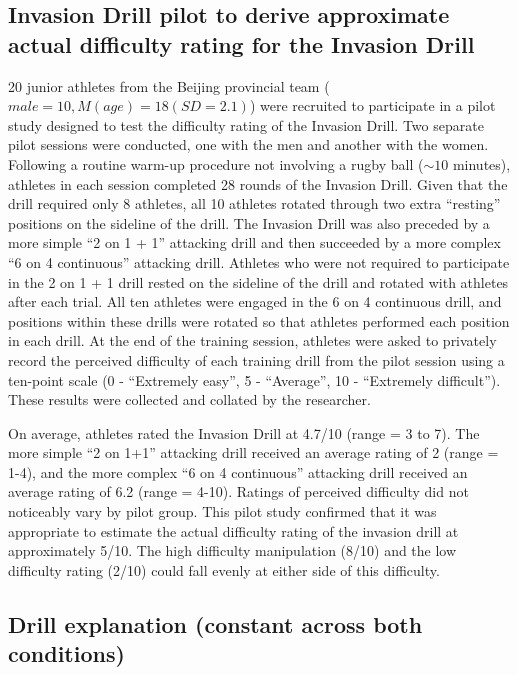 \subsection{Invasion Drill pilot to derive approximate actual difficulty rating for the Invasion Drill\label{app9:difficultyPilot}}
20 junior athletes from the Beijing provincial team ($male = 10,  M(age) = 18 (SD = 2.1)$) were recruited to participate in a pilot study designed to test the difficulty rating of the Invasion Drill.  Two separate pilot sessions were conducted, one with the men and another with the women.  Following a routine warm-up procedure not involving a rugby ball ($\sim10$ minutes), athletes in each session completed 28 rounds of the Invasion Drill.  Given that the drill required only 8 athletes, all 10 athletes rotated through two extra ``resting'' positions on the sideline of the drill.  The Invasion Drill was also preceded by a more simple ``2 on 1 + 1'' attacking drill and then succeeded by a more complex ``6 on 4 continuous'' attacking drill.  Athletes who were not required to participate in the 2 on 1 + 1 drill rested on the sideline of the drill and rotated with athletes after each trial.  All ten athletes were engaged in the 6 on 4 continuous drill, and positions within these drills were rotated so that athletes performed each position in each drill.  At the end of the training session, athletes were asked to privately record the perceived difficulty of each training drill from the pilot session using a ten-point scale (0 - ``Extremely easy'', 5 - ``Average'', 10 - ``Extremely difficult''). These results were collected and collated by the researcher.

On average, athletes rated the Invasion Drill at 4.7/10 (range = 3 to 7).  The more simple ``2 on 1+1'' attacking drill received an average rating of 2 (range = 1-4), and the more complex ``6 on 4 continuous'' attacking drill received an average rating of 6.2 (range = 4-10). Ratings of perceived difficulty did not noticeably vary by pilot group. This pilot study confirmed that it was appropriate to estimate the actual difficulty rating of the invasion drill at approximately 5/10. The high difficulty manipulation (8/10) and the low difficulty rating (2/10) could fall evenly at either side of this difficulty.



\subsection{\label{app9:drillExplanation}Drill explanation (constant across both conditions)}

